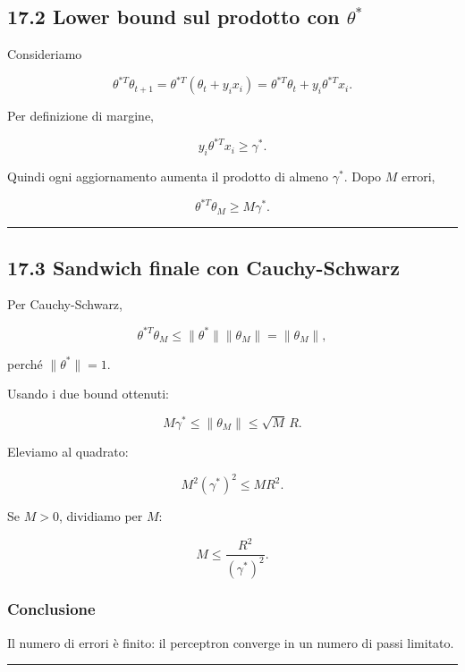 \documentclass{article}
\begin{document}
\subsection{\texorpdfstring{17.2 Lower bound sul prodotto con
\(\theta^*\)}{17.2 Lower bound sul prodotto con \textbackslash theta\^{}*}}\label{lower-bound-sul-prodotto-con-theta}

Consideriamo

\[
\theta^{*T}\theta_{t+1}
=
\theta^{*T}(\theta_t+y_ix_i)
=
\theta^{*T}\theta_t + y_i\theta^{*T}x_i.
\]

Per definizione di margine,

\[
y_i\theta^{*T}x_i \ge \gamma^*.
\]

Quindi ogni aggiornamento aumenta il prodotto di almeno \(\gamma^*\).
Dopo \(M\) errori,

\[
\theta^{*T}\theta_M \ge M\gamma^*.
\]

\begin{center}\rule{0.5\linewidth}{0.5pt}\end{center}

\subsection{17.3 Sandwich finale con
Cauchy-Schwarz}\label{sandwich-finale-con-cauchy-schwarz}

Per Cauchy-Schwarz,

\[
\theta^{*T}\theta_M \le \|\theta^*\|\|\theta_M\| = \|\theta_M\|,
\]

perché \(\|\theta^*\|=1\).

Usando i due bound ottenuti:

\[
M\gamma^* \le \|\theta_M\| \le \sqrt{M}\,R.
\]

Eleviamo al quadrato:

\[
M^2(\gamma^*)^2 \le M R^2.
\]

Se \(M>0\), dividiamo per \(M\):

\[
M \le \frac{R^2}{(\gamma^*)^2}.
\]

\subsubsection{Conclusione}\label{conclusione-8}

Il numero di errori è finito: il perceptron converge in un numero di
passi limitato.

\begin{center}\rule{0.5\linewidth}{0.5pt}\end{center}
\end{document}
